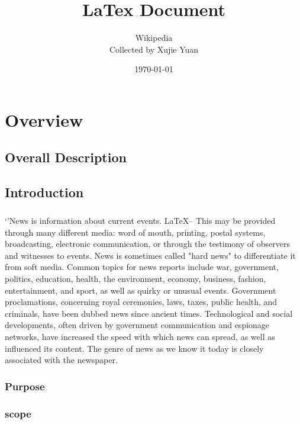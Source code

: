 \documentclass{book}
\title{LaTex Document}
\author{Wikipedia \\ Collected by Xujie Yuan}
\date{\today}
\begin{document}
    \maketitle
    \tableofcontents
    \chapter{Overview}
    \section{Overall Description}

    \section{Introduction}
    \paragraph{}
    `'News is information about current events. \LaTeX--
    This may be provided through many different media: 
    word of mouth, printing, postal systems, broadcasting, 
    electronic communication, or through the testimony of 
    observers and witnesses to events. News is sometimes called 
    "hard news" to differentiate it from soft media. Common topics 
    for news reports include war, government, politics, education, 
    health, the environment, economy, business, fashion, 
    entertainment, and sport, as well as quirky or unusual events. 
    Government proclamations, concerning royal ceremonies, laws, taxes, 
    public health, and criminals, 
    have been dubbed news since ancient times. Technological and 
    social developments, often driven by government communication 
    and espionage networks, have increased the speed with which news 
    can spread, as well as influenced its content. The genre of 
    news as we know it today is closely associated with the newspaper.
    \subsection{Purpose}

    \subsection{scope}
\end{document}
